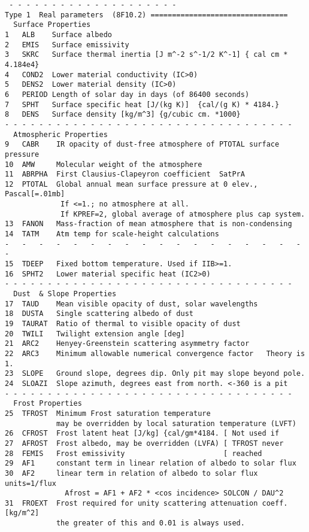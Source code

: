 \documentclass{article}
\begin{document}
\begin{verbatim} 
 - - - - - - - - - - - - - - - - - - - -
Type 1	Real parameters  (8F10.2) ================================
  Surface Properties
1   ALB    Surface albedo
2   EMIS   Surface emissivity
3   SKRC   Surface thermal inertia [J m^-2 s^-1/2 K^-1] { cal cm * 4.184e4}
4   COND2  Lower material conductivity (IC>0)
5   DENS2  Lower material density (IC>0)
6   PERIOD Length of solar day in days (of 86400 seconds)
7   SPHT   Surface specific heat [J/(kg K)]  {cal/(g K) * 4184.}
8   DENS   Surface density [kg/m^3] {g/cubic cm. *1000}
- - - - - - - - - - - - - - - - - - - - - - - - - - - - - - - - - - 
  Atmospheric Properties
9   CABR    IR opacity of dust-free atmosphere of PTOTAL surface pressure
10  AMW     Molecular weight of the atmosphere
11  ABRPHA  First Clausius-Clapeyron coefficient  SatPrA 
12  PTOTAL  Global annual mean surface pressure at 0 elev., Pascal[=.01mb]
             If <=1.; no atmosphere at all.
             If KPREF=2, global average of atmosphere plus cap system.
13  FANON   Mass-fraction of mean atmosphere that is non-condensing
14  TATM    Atm temp for scale-height calculations
-   -   -   -   -   -   -   -   -   -   -   -   -   -   -   -   -   -   -   
15  TDEEP   Fixed bottom temperature. Used if IIB>=1.
16  SPHT2   Lower material specific heat (IC2>0)
- - - - - - - - - - - - - - - - - - - - - - - - - - - - - - - - - - 
  Dust  & Slope Properties
17  TAUD    Mean visible opacity of dust, solar wavelengths
18  DUSTA   Single scattering albedo of dust
19  TAURAT  Ratio of thermal to visible opacity of dust
20  TWILI   Twilight extension angle [deg]
21  ARC2    Henyey-Greenstein scattering asymmetry factor
22  ARC3    Minimum allowable numerical convergence factor   Theory is 1.
23  SLOPE   Ground slope, degrees dip. Only pit may slope beyond pole.
24  SLOAZI  Slope azimuth, degrees east from north. <-360 is a pit
- - - - - - - - - - - - - - - - - - - - - - - - - - - - - - - - - - 
  Frost Properties
25  TFROST  Minimum Frost saturation temperature
            may be overridden by local saturation temperature (LVFT)
26  CFROST  Frost latent heat [J/kg] {cal/gm*4184. [ Not used if
27  AFROST  Frost albedo, may be overridden (LVFA) [ TFROST never
28  FEMIS   Frost emissivity                       [ reached
29  AF1     constant term in linear relation of albedo to solar flux
30  AF2     linear term in relation of albedo to solar flux units=1/flux
              Afrost = AF1 + AF2 * <cos incidence> SOLCON / DAU^2
31  FROEXT  Frost required for unity scattering attenuation coeff. [kg/m^2]
            the greater of this and 0.01 is always used.

\end{verbatim}
\end{document}
